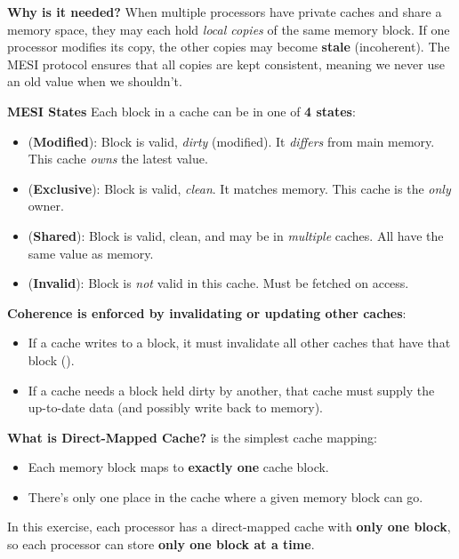 \highspace
\textcolor{Green3}{ \textbf{Why is it needed?}} When multiple processors have private caches and share a memory space, they may each hold \emph{local copies} of the same memory block. If one processor modifies its copy, the other copies may become \textbf{stale} (incoherent). The MESI protocol ensures that all copies are kept consistent, meaning we never use an old value when we shouldn't.

\highspace
\textcolor{Green3}{ \textbf{MESI States}} Each block in a cache can be in one of \textbf{4 states}:
\begin{itemize}
    \item {} (\textbf{Modified}): Block is valid, \emph{dirty} (modified). It \emph{differs} from main memory. This cache \emph{owns} the latest value.
    \item {} (\textbf{Exclusive}): Block is valid, \emph{clean}. It matches memory. This cache is the \emph{only} owner.
    \item {} (\textbf{Shared}): Block is valid, clean, and may be in \emph{multiple} caches. All have the same value as memory.
    \item {} (\textbf{Invalid}): Block is \emph{not} valid in this cache. Must be fetched on access.
\end{itemize}
\textbf{Coherence is enforced by invalidating or updating other caches}:
\begin{itemize}
    \item If a cache writes to a block, it must invalidate all other caches that have that block ().
    \item If a cache needs a block held dirty by another, that cache must supply the up-to-date data (and possibly write back to memory).
\end{itemize}
\textcolor{Green3}{ \textbf{What is Direct-Mapped Cache?}}  is the simplest cache mapping:
\begin{itemize}
    \item Each memory block maps to \textbf{exactly one} cache block.
    \item There's only one place in the cache where a given memory block can go.
\end{itemize}
In this exercise, each processor has a direct-mapped cache with \textbf{only one block}, so each processor can store \textbf{only one block at a time}.

